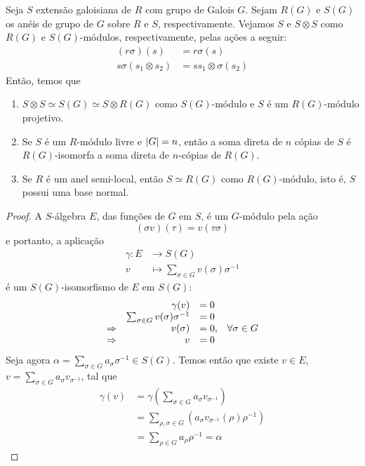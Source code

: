 \begin{teo}\label{teo:aneldegrupo}
Seja $S$ extensão galoisiana de $R$ com grupo de Galois $G$. Sejam $R(G)$ e $S(G)$ os anéis de grupo de $G$ sobre $R$ e $S$, respectivamente. Vejamos $S$ e $S\otimes S$ como $R(G)$ e $S(G)$-módulos, respectivamente, pelas ações a seguir:
\begin{align*}
(r\sigma)(s) &= r\sigma(s) \\
s\sigma(s_1\otimes s_2) &= ss_1 \otimes \sigma(s_2)
\end{align*}
Então, temos que 
\begin{enumerate}
    \item $S\otimes S \simeq S(G) \simeq S\otimes R(G)$ como $S(G)$-módulo e $S$ é um $R(G)$-módulo projetivo.
    \item Se $S$ é um $R$-módulo livre e $\left| G \right|=n$, então a soma direta de $n$ cópias de $S$ é $R(G)$-isomorfa a soma direta de $n$-cópias de $R(G)$.
    \item Se $R$ é um anel semi-local, então $S\simeq R(G)$ como $R(G)$-módulo, isto é, $S$ possui uma base normal.
\end{enumerate}
\begin{proof}
A $S$-álgebra $E$, das funções de $G$ em $S$, é um $G$-módulo pela ação \[(\sigma v)(\tau) = v(\tau\sigma)\] e portanto, a aplicação
\begin{align*}
    \gamma: E &\rightarrow S(G) \\
    v &\mapsto \sum_{\sigma \in G} v(\sigma)\sigma^{-1}
\end{align*}
é um $S(G)$-isomorfismo de $E$ em $S(G)$:
\[\begin{array}{r r l l}
    & \gamma(v) &= 0 & \\
    & \sum_{\sigma \in G} v(\sigma)\sigma^{-1} &=0 & \\
    \Rightarrow & v(\sigma) &= 0, & \forall \sigma \in G \\
    \Rightarrow & v &= 0 &
\end{array}\]
Seja agora $\alpha = \sum_{\sigma \in G} a_\sigma \sigma^{-1} \in S(G)$. Temos então que existe $v \in E$, $v=\sum_{\sigma \in G}a_\sigma v_{\sigma^{-1}}$, tal que
\begin{align*}
    \gamma(v) &= \gamma\left(\sum_{\sigma \in G}a_\sigma v_{\sigma^{-1}}\right) \\
    &= \sum_{\rho,\sigma \in G} \left(a_\sigma v_{\sigma^{-1}} (\rho) \rho^{-1}\right) \\
    &= \sum_{\rho \in G} a_\rho \rho^{-1} = \alpha
\end{align*}


\end{proof}
\end{teo}
